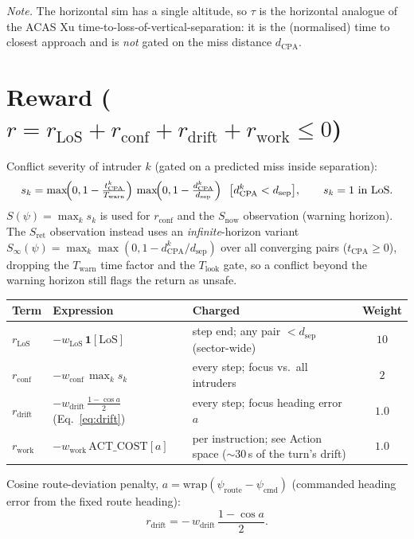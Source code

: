 \documentclass[11pt, a4paper]{article}
\begin{document}
\noindent\emph{Note.} The horizontal sim has a single altitude, so $\tau$ is the horizontal
analogue of the ACAS Xu time-to-loss-of-vertical-separation: it is the (normalised) time to
closest approach and is \emph{not} gated on the miss distance $d_\text{CPA}$.

\section{Reward ($r=r_\text{LoS}+r_\text{conf}+r_\text{drift}+r_\text{work}\le 0$)}
Conflict severity of intruder $k$ (gated on a predicted miss inside separation):
\begin{equation}
s_k=\max\!\Bigl(0,1-\tfrac{t_\text{CPA}^k}{T_\text{warn}}\Bigr)\,
     \max\!\Bigl(0,1-\tfrac{d_\text{CPA}^k}{d_\text{sep}}\Bigr)\ \ \bigl[d_\text{CPA}^k<d_\text{sep}\bigr],
\qquad s_k=1\ \text{in LoS.}
\label{eq:score}
\end{equation}
$S(\psi)=\max_k s_k$ is used for $r_\text{conf}$ and the $S_\text{now}$ observation (warning horizon).
The $S_\text{ret}$ observation instead uses an \emph{infinite}-horizon variant
$S_\infty(\psi)=\max_k\max(0,1-d_\text{CPA}^k/d_\text{sep})$ over all converging pairs ($t_\text{CPA}\ge0$),
dropping the $T_\text{warn}$ time factor and the $T_\text{look}$ gate, so a conflict beyond the warning
horizon still flags the return as unsafe.
\begin{table}[h]\centering
\begin{tabular}{lllc}
\toprule
Term & Expression & Charged & Weight\\
\midrule
$r_\text{LoS}$  & $-w_\text{LoS}\,\mathbf 1[\text{LoS}]$              & step end; any pair $<d_\text{sep}$ (sector-wide) & $10$\\
$r_\text{conf}$ & $-w_\text{conf}\,\max_k s_k$                        & every step; focus vs.\ all intruders             & $2$\\
$r_\text{drift}$& $-w_\text{drift}\,\tfrac{1-\cos a}{2}$ (Eq.~\ref{eq:drift}) & every step; focus heading error $a$       & $1.0$\\
$r_\text{work}$ & $-w_\text{work}\,\mathrm{ACT\_COST}[a]$              & per instruction; see Action space ($\sim30$\,s of the turn's drift) & $1.0$\\
\bottomrule
\end{tabular}
\end{table}

Cosine route-deviation penalty, $a=\mathrm{wrap}(\psi_\text{route}-\psi_\text{cmd})$
(commanded heading error from the fixed route heading):
\begin{equation}
r_\text{drift}=-\,w_\text{drift}\,\frac{1-\cos a}{2}.
\label{eq:drift}
\end{equation}
\end{document}
